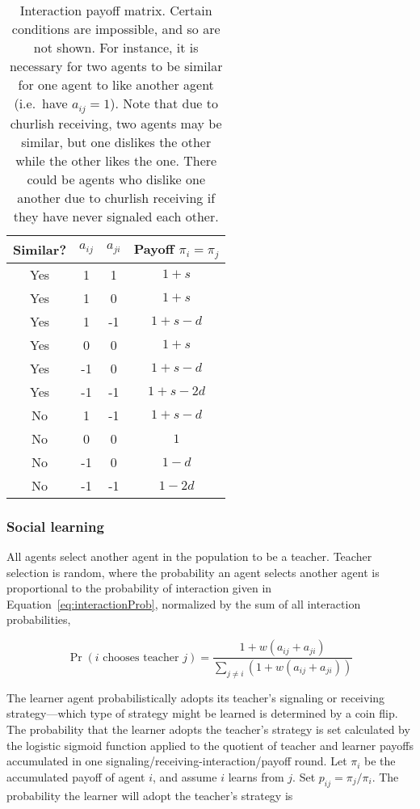 \documentclass[11pt,letterpaper]{article}
\begin{document}
\begin{table}[h]
  \centering
  \begin{tabular}{cccc}
    Similar? & $a_{ij}$ & $a_{ji}$ & Payoff $\pi_i = \pi_j$ \\
    \toprule
    Yes   & 1 & 1   & $1 + s$ \\
    Yes   & 1 & 0   & $1 + s$ \\
    Yes   & 1 & -1  & $1 + s - d$ \\
    Yes   & 0 & 0   & $1 + s$ \\
    Yes   & -1 & 0  & $1 + s - d$ \\
    Yes   & -1 & -1 & $1 + s - 2d$ \\
    \midrule
    No    & 1 & -1  & $1 + s - d$ \\
    No    & 0 & 0   & $1$ \\
    No    & -1 & 0  & $1 - d$ \\
    No    & -1 & -1 & $1 - 2d$ \\
  \end{tabular}
  \caption{Interaction payoff matrix. Certain conditions are impossible, and so are not
  shown. For instance, it is necessary for two agents to be similar for 
  one agent to like another agent (i.e.\ have $a_{ij} = 1$). Note that
  due to churlish receiving, two agents may be similar, but one dislikes the
  other while the other likes the one. There could be agents who dislike one
  another due to churlish receiving if they have never signaled each other.}
\end{table}

\subsubsection{Social learning}

All agents select another agent in the population to be a teacher.
Teacher selection is random, where the probability an agent selects another
agent is proportional to the probability of interaction given in 
Equation~\ref{eq:interactionProb}, normalized by the sum of all interaction
probabilities,

\begin{equation}
  \Pr(\text{$i$ chooses teacher $j$}) = 
    \frac{1 + w(a_{ij} + a_{ji})}{\sum_{j \neq i}(1 + w(a_{ij} + a_{ji}))}
\end{equation}

The 
learner agent probabilistically adopts its teacher's signaling or receiving 
strategy---which type of strategy might be learned is determined by a coin flip. 
The probability that the learner adopts the teacher's strategy is set 
calculated by the logistic sigmoid function applied to the quotient of 
teacher and learner payoffs accumulated in one
signaling/receiving-interaction/payoff round.
Let $\pi_{i}$ be the accumulated payoff of agent $i$, and assume $i$ learns
from $j$. Set $p_{ij} = \pi_{j} / \pi_i$. 
The probability the learner will adopt the teacher's strategy is
\end{document}
